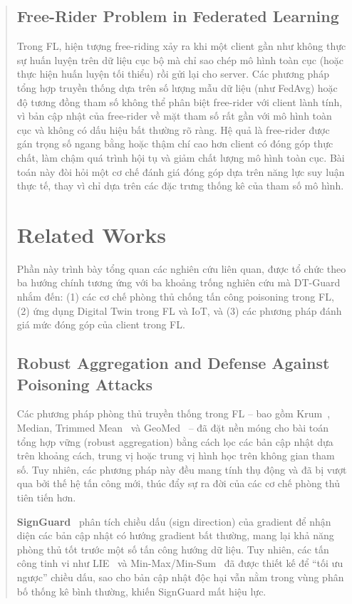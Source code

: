 \documentclass[runningheads]{llncs}
\begin{document}
\begin{abstract}
\subsection{Free-Rider Problem in Federated Learning}

Trong FL, hiện tượng free-riding xảy ra khi một client gần như không thực sự huấn luyện trên dữ liệu cục bộ mà chỉ sao chép mô hình toàn cục (hoặc thực hiện huấn luyện tối thiểu) rồi gửi lại cho server. Các phương pháp tổng hợp truyền thống dựa trên số lượng mẫu dữ liệu (như FedAvg) hoặc độ tương đồng tham số không thể phân biệt free-rider với client lành tính, vì bản cập nhật của free-rider về mặt tham số rất gần với mô hình toàn cục và không có dấu hiệu bất thường rõ ràng. Hệ quả là free-rider được gán trọng số ngang bằng hoặc thậm chí cao hơn client có đóng góp thực chất, làm chậm quá trình hội tụ và giảm chất lượng mô hình toàn cục. Bài toán này đòi hỏi một cơ chế đánh giá đóng góp dựa trên năng lực suy luận thực tế, thay vì chỉ dựa trên các đặc trưng thống kê của tham số mô hình.

\section{Related Works}

Phần này trình bày tổng quan các nghiên cứu liên quan, được tổ chức theo ba hướng chính tương ứng với ba khoảng trống nghiên cứu mà DT-Guard nhắm đến: (1) các cơ chế phòng thủ chống tấn công poisoning trong FL, (2) ứng dụng Digital Twin trong FL và IoT, và (3) các phương pháp đánh giá mức đóng góp của client trong FL.

\subsection{Robust Aggregation and Defense Against Poisoning Attacks}

Các phương pháp phòng thủ truyền thống trong FL -- bao gồm Krum~\cite{blanchard2017machine}, Median, Trimmed Mean~\cite{yin2018byzantine} và GeoMed~\cite{pillutla2022robust} -- đã đặt nền móng cho bài toán tổng hợp vững (robust aggregation) bằng cách lọc các bản cập nhật dựa trên khoảng cách, trung vị hoặc trung vị hình học trên không gian tham số. Tuy nhiên, các phương pháp này đều mang tính thụ động và đã bị vượt qua bởi thế hệ tấn công mới, thúc đẩy sự ra đời của các cơ chế phòng thủ tiên tiến hơn.

\textbf{SignGuard}~\cite{xu2022signguard} phân tích chiều dấu (sign direction) của gradient để nhận diện các bản cập nhật có hướng gradient bất thường, mang lại khả năng phòng thủ tốt trước một số tấn công hướng dữ liệu. Tuy nhiên, các tấn công tinh vi như LIE~\cite{baruch2019little} và Min-Max/Min-Sum~\cite{shejwalkar2021manipulating} đã được thiết kế để ``tối ưu ngược'' chiều dấu, sao cho bản cập nhật độc hại vẫn nằm trong vùng phân bố thống kê bình thường, khiến SignGuard mất hiệu lực.


\end{abstract}
\end{document}
